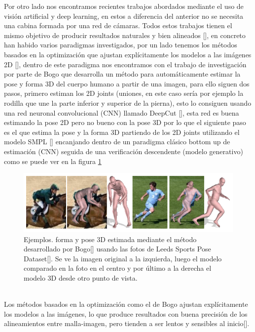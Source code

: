 Por otro lado nos encontramos recientes trabajos abordados mediante el uso de visión artificial y deep learning, en estos a diferencia del anterior no se necesita una cabina formada por una red de cámaras. Todos estos trabajos tienen el mismo objetivo de producir resultados naturales y bien alineados [\cite{pymaf}], en concreto han habido varios paradigmas investigados, por un lado tenemos los métodos basados en la optimización que ajustan explícitamente los modelos a las imágenes 2D [\cite{keepsmpl}], dentro de este paradigma nos encontramos con el trabajo de investigación por parte de Bogo que desarrolla un método para automáticamente estimar la pose y forma 3D del cuerpo humano a partir de una imagen, para ello siguen dos pasos, primero estiman los 2D joints (uniones, en este caso sería por ejemplo la rodilla que une la parte inferior y superior de la pierna), esto lo consiguen usando una red neuronal convolucional (CNN) llamado DeepCut [\cite{deepcut}], esta red es buena estimando la pose 2D pero no bueno con la pose 3D por lo que el siguiente paso es el que estima la pose y la forma 3D partiendo de los 2D joints utilizando el modelo SMPL [\cite{smpl}] encanjando dentro de un paradigma clásico bottom up de estimación (CNN) seguida de una verificación descendente (modelo generativo) como se puede ver en la figura \ref{fig:figura3}
\begin{figure}[!h]
	\centering
	\includegraphics[scale=0.7]{imagenes/estadoarte2.png}
	\caption{Ejemplos. forma y pose 3D estimada mediante el método desarrollado por Bogo[\cite{keepsmpl}] usando las fotos de Leeds Sports Pose Dataset[\cite{edafig2}]. Se ve la imagen original a la izquierda, luego el modelo comparado en la foto en el centro y por último a la derecha el modelo 3D desde otro punto de vista. }
	\label{fig:figura3}
\end{figure}
\\
Los métodos basados en la optimización como el de Bogo ajustan explícitamente los modelos a las imágenes, lo que produce resultados con buena precisión de los alineamientos entre malla-imagen, pero tienden a ser lentos y sensibles al inicio[\cite{pymaf}].

